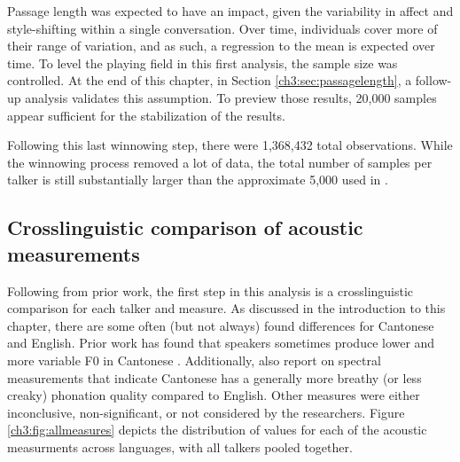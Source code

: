 Passage length was expected to have an impact, given the variability in affect and style-shifting within a single conversation. Over time, individuals cover more of their range of variation, and as such, a regression to the mean is expected over time. To level the playing field in this first analysis, the sample size was controlled. At the end of this chapter, in Section \ref{ch3:sec:passagelength}, a follow-up analysis validates this assumption. To preview those results, 20,000 samples appear sufficient for the stabilization of the results.  

Following this last winnowing step, there were 1,368,432 total observations. While the winnowing process removed a lot of data, the total number of samples per talker is still substantially larger than the approximate 5,000 used in \citet{lee_2019_acoustic}.

\subsection{Crosslinguistic comparison of acoustic measurements}\label{ch3:sec:comparison} %

Following from prior work, the first step in this analysis is a crosslinguistic comparison for each talker and measure. As discussed in the introduction to this chapter, there are some often (but not always) found differences for Cantonese and English. Prior work has found that speakers sometimes produce lower and more variable F0 in Cantonese \citep{altenberg_2006_f0,ng_2012_ltas,ng_2010_voice}. Additionally, \citet{ng_2012_ltas} also report on spectral measurements that indicate Cantonese has a generally more breathy (or less creaky) phonation quality compared to English. Other measures were either inconclusive, non-significant, or not considered by the researchers. Figure \ref{ch3:fig:allmeasures} depicts the distribution of values for each of the acoustic measurments across languages, with all talkers pooled together. 

